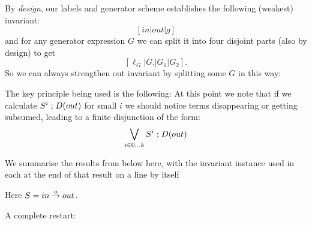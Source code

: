 By \emph{design}, our labels and generator scheme
establishes the following (weakest) invariant:
\[ [in|out|g]\]
and for any generator expression $G$ we can split it into
four disjoint parts (also by design) to get
\[  [\ell_G|G_{:}|G_1|G_2] . \]
So we can always strengthen out invariant by splitting some $G$
in this way:
\newpage
{}

The key principle being used is the following:
At this point we note that if we calculate  $S^i\mathrel{;} D(out)$
for small $i$ we should notice terms disappearing or getting subsumed,
leading to a finite disjunction of the form:
\[
  \bigvee_{i \in 0\dots k} S^i \mathrel{;} D(out)
\]

We summarise the results from below here,
with the invariant instance used in each at the end
of that result on a line by itself


\newpage
{}

Here $S = in \stackrel{a}\rightarrow out$.

A complete restart:

